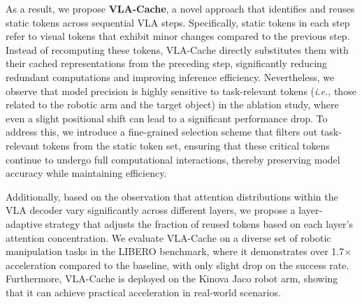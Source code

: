 As a result, we propose \textbf{VLA-Cache}, a novel approach that identifies and reuses static tokens across sequential VLA steps. Specifically, static tokens in each step refer to visual tokens that exhibit minor changes compared to the previous step. Instead of recomputing these tokens, VLA-Cache directly substitutes them with their cached representations from the preceding step, significantly reducing redundant computations and improving inference efficiency. Nevertheless, we observe that model precision is highly sensitive to task-relevant tokens (\textit{i.e.}, those related to the robotic arm and the target object) in the ablation study, where even a slight positional shift can lead to a significant performance drop. To address this, we introduce a fine-grained selection scheme that filters out task-relevant tokens from the static token set, ensuring that these critical tokens continue to undergo full computational interactions, thereby preserving model accuracy while maintaining efficiency.


Additionally, based on the observation that attention distributions within the VLA decoder vary significantly across different layers, we propose a layer-adaptive strategy that adjusts the fraction of reused tokens
based on each layer’s attention concentration. We evaluate VLA-Cache on a diverse set of robotic manipulation tasks in the LIBERO benchmark, where it demonstrates over 1.7× acceleration compared to the baseline, with only slight drop on the success rate. Furthermore, VLA-Cache is deployed on the Kinova Jaco robot arm, showing that it can achieve practical acceleration in real-world scenarios.
